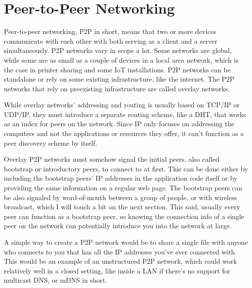 \section{Peer-to-Peer Networking}
Peer-to-peer networking, P2P in short, means that two or more devices communicate with each other with both serving as a client and a server simultaneously. P2P networks vary in scope a lot. Some networks are global, while some are as small as a couple of devices in a local area network, which is the case in printer sharing and some IoT installations. P2P networks can be standalone or rely on some existing infrastructure, like the internet. The P2P networks that rely on preexisting infrastructure are called overlay networks.

While overlay networks' addressing and routing is usually based on TCP/IP or UDP/IP, they must introduce a separate routing scheme, like a DHT, that works as an index for peers on the network. Since IP only focuses on addressing the computers and not the applications or resources they offer, it can't function as a peer discovery scheme by itself.

Overlay P2P networks must somehow signal the initial peers, also called bootstrap or introductory peers, to connect to at first. This can be done either by including the bootstrap peers' IP addresses in the application code itself or by providing the same information on a regular web page. The bootstrap peers can be also signaled by word-of-mouth between a group of people, or with wireless broadcast, which I will touch a bit on the next section. This said, usually every peer can function as a bootstrap peer, so knowing the connection info of a single peer on the network can potentially introduce you into the network at large.

A simple way to create a P2P network would be to share a single file with anyone who connects to you that has all the IP addresses you've ever connected with. This would be an example of an unstructured P2P network, which could work relatively well in a closed setting, like inside a LAN if there's no support for multicast DNS, or mDNS in short.

